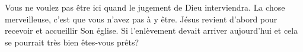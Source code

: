 Vous ne voulez pas être ici quand le jugement de Dieu interviendra.
 La chose merveilleuse, c'est que vous n'avez pas à y être.
 Jésus revient d'abord pour recevoir et accueillir Son église. 
 Si l'enlèvement devait arriver aujourd'hui
 \ocadr et cela se pourrait très bien \fcadr{} êtes-vous prêts? 

\dvrule




